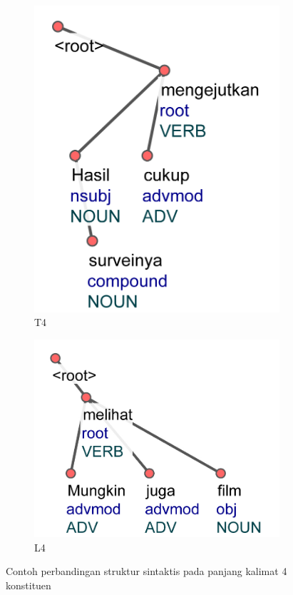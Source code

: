 \begin{figure}
\centering

\begin{subfigure}{.3\linewidth}
  \centering
  \includegraphics[width=1\linewidth] {pics/ts662.jpg} 
	\caption{T4}
	\label{fig:ts662} 
\end{subfigure}
%
\begin{subfigure}{.35\linewidth}
  \centering
  \includegraphics[width=1\linewidth]{pics/ls1102.jpg} 
	\caption{L4}
	\label{fig:ls1102} 
\end{subfigure}

\caption{Contoh perbandingan struktur sintaktis pada panjang kalimat 4 konstituen}
\label{fig:struktur4}
\end{figure}

